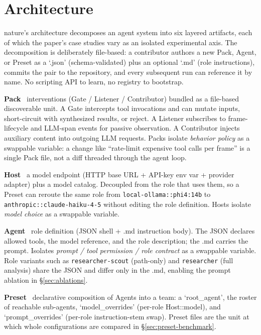 \documentclass[11pt,a4paper]{article}
\begin{document}
\section{Architecture}
\label{sec:architecture}

nature's architecture decomposes an agent system into six
layered artifacts, each of which the paper's case studies vary
as an isolated experimental axis. The decomposition is
deliberately file-based: a contributor authors a new Pack,
Agent, or Preset as a `.json' (schema-validated) plus an
optional `.md' (role instructions), commits the pair to the
repository, and every subsequent run can reference it by name.
No scripting API to learn, no registry to bootstrap.

\textbf{Pack} \textemdash\ interventions (Gate / Listener /
Contributor) bundled as a file-based discoverable unit. A Gate
intercepts tool invocations and can mutate inputs, short-circuit
with synthesized results, or reject. A Listener subscribes to
frame-lifecycle and LLM-span events for passive observation. A
Contributor injects auxiliary content into outgoing LLM
requests. Packs isolate \emph{behavior policy} as a swappable
variable: a change like ``rate-limit expensive tool calls per
frame'' is a single Pack file, not a diff threaded through the
agent loop.

\textbf{Host} \textemdash\ a model endpoint (HTTP base URL +
API-key env var + provider adapter) plus a model catalog.
Decoupled from the role that uses them, so a Preset can reroute
the same role from \texttt{local-ollama::phi4:14b} to
\texttt{anthropic::claude-haiku-4-5} without editing the role
definition. Hosts isolate \emph{model choice} as a swappable
variable.

\textbf{Agent} \textemdash\ role definition (JSON shell + .md
instruction body). The JSON declares allowed tools, the model
reference, and the role description; the .md carries the
prompt. Isolates \emph{prompt / tool permission / role contract}
as a swappable variable. Role variants such as
\texttt{researcher-scout} (path-only) and \texttt{researcher}
(full analysis) share the JSON and differ only in the .md,
enabling the prompt ablation in \S\ref{sec:ablations}.

\textbf{Preset} \textemdash\ declarative composition of Agents
into a team: a `root\_agent', the roster of reachable
sub-agents, `model\_overrides' (per-role Host::model), and
`prompt\_overrides' (per-role instruction-stem swap). Preset
files are the unit at which whole configurations are compared
in \S\ref{sec:preset-benchmark}.
\end{document}
